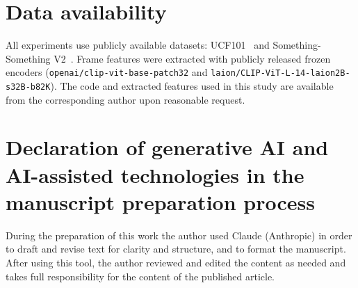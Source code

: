 \documentclass[a4paper,fleqn]{cas-dc}
\begin{document}
\section*{Data availability}
All experiments use publicly available datasets: UCF101~\cite{soomro2012ucf101}
and Something-Something V2~\cite{goyal2017ssv2}. Frame features were
extracted with publicly released frozen encoders
(\texttt{openai/clip-vit-base-patch32} and
\texttt{laion/CLIP-ViT-L-14-laion2B-s32B-b82K}). The code and extracted
features used in this study are available from the corresponding author
upon reasonable request.

\section*{Declaration of generative AI and AI-assisted technologies in the manuscript preparation process}
During the preparation of this work the author used Claude (Anthropic) in
order to draft and revise text for clarity and structure, and to format
the manuscript. After using this tool, the author reviewed and edited the
content as needed and takes full responsibility for the content of the
published article.



\end{document}
